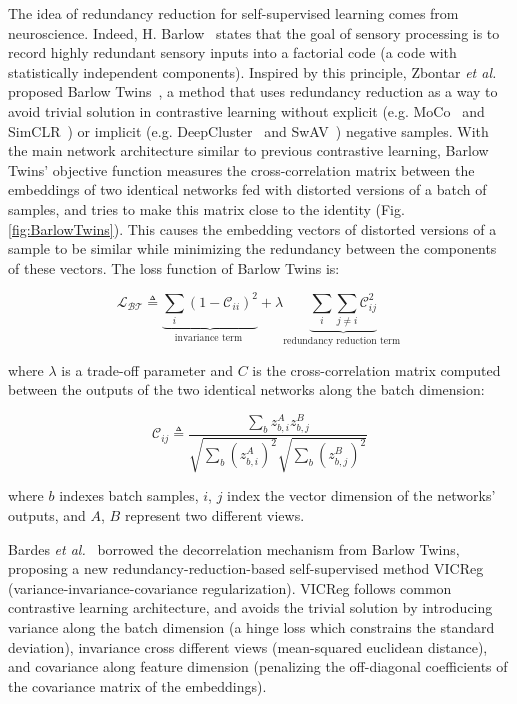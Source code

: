 \documentclass[lettersize,journal]{IEEEtran}
\newcommand{\etal}{\textit{et al.}}
\begin{document}
The idea of redundancy reduction for self-supervised learning comes from neuroscience. Indeed, H. Barlow~\cite{barlow1961possible} states that the goal of sensory processing is to record highly redundant sensory inputs into a factorial code (a code with statistically independent components). Inspired by this principle, Zbontar \etal~ proposed Barlow Twins~\cite{zbontar2021barlow}, a method that uses redundancy reduction as a way to avoid trivial solution in contrastive learning without explicit (e.g. MoCo~\cite{he2020momentum} and SimCLR~\cite{chen2020simple})  or implicit (e.g. DeepCluster~\cite{caron2018deep} and SwAV~\cite{caron2020unsupervised}) negative samples. With the main network architecture similar to previous contrastive learning, Barlow Twins’ objective function measures the cross-correlation matrix between the embeddings of two identical networks fed with distorted versions of a batch of samples, and tries to make this matrix close to the identity (Fig. \ref{fig:BarlowTwins}). This causes the embedding vectors of distorted versions of a sample to be similar while minimizing the redundancy between the components of these vectors. The loss function of Barlow Twins is:

\begin{equation}
\mathcal{L}_{\mathcal{B} \mathcal{T}} \triangleq \underbrace{\sum_{i}\left(1-\mathcal{C}_{i i}\right)^{2}}_{\text {invariance term }}+\lambda \underbrace{\sum_{i} \sum_{j \neq i} \mathcal{C}_{i j}^{2}}_{\text {redundancy reduction term }}
\end{equation}

\noindent where $\lambda$ is a trade-off parameter and $C$ is the cross-correlation matrix computed between the outputs of the two identical networks along the batch dimension:

\begin{equation}
\mathcal{C}_{i j} \triangleq \frac{\sum_{b} z_{b, i}^{A} z_{b, j}^{B}}{\sqrt{\sum_{b}\left(z_{b, i}^{A}\right)^{2}} \sqrt{\sum_{b}\left(z_{b, j}^{B}\right)^{2}}}
\end{equation}

\noindent where $b$ indexes batch samples, $i$, $j$ index the vector dimension of the networks’ outputs, and $A$, $B$ represent two different views.





Bardes \etal~\cite{bardes2021vicreg} borrowed the decorrelation mechanism from Barlow Twins, proposing a new redundancy-reduction-based self-supervised method VICReg (variance-invariance-covariance regularization). VICReg follows common contrastive learning architecture, and avoids the trivial solution by introducing variance along the batch dimension (a hinge loss which constrains the standard deviation), invariance cross different views (mean-squared euclidean distance), and covariance along feature dimension (penalizing the off-diagonal coefficients of the covariance matrix of the embeddings).
\end{document}
